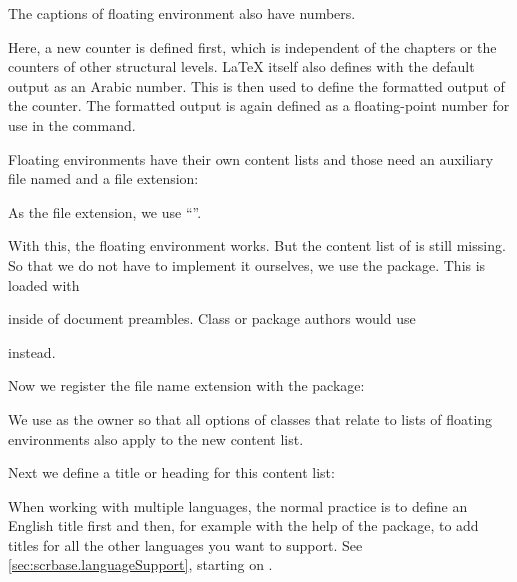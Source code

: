 The captions of floating environment also have numbers.
\begin{lstcode}
  \newcommand*{\remarkboxformat}{%
    Remark~\theremarkbox\csname autodot\endcsname}
  \newcommand*{\fnum@remarkbox}{\remarkboxformat}
\end{lstcode}
Here, a new counter is defined first, which is independent of the chapters
or the counters of other structural levels. \LaTeX{} itself also defines
 with the default output as an Arabic number.
This is then used to define the formatted output of the
counter. The formatted output is again defined as a floating-point
number for use in the  command.

Floating environments have their own content lists
and those need an auxiliary file named  and a file 
extension:
\begin{lstcode}
  \newcommand*{\ext@remarkbox}{lor}
\end{lstcode}
As the file extension, we use ``''.

With this, the floating environment works. But the content list of 
is still missing. So that we do not have to implement it ourselves, we
use the  package. This is loaded with
\begin{lstcode}
  \usepackage{tocbasic}
\end{lstcode}
inside of document preambles. Class or package authors would use
\begin{lstcode}
  \RequirePackage{tocbasic}
\end{lstcode}
instead.

Now we register the file name extension with the
 package:
\begin{lstcode}
\end{lstcode}
We use  as the owner so that all options of \KOMAScript{}
classes that relate to lists of floating environments also apply to the new
content list.

Next we define a title or heading for this content list:
\begin{lstcode}
  \newcommand*{\listoflorname}{List of Remarks}
\end{lstcode}
When working with multiple languages, the normal practice is to define an
English title first and then, for example with the help of the
 package, to add titles for all the other languages you want
to support. See \autoref{sec:scrbase.languageSupport}, starting on
.

